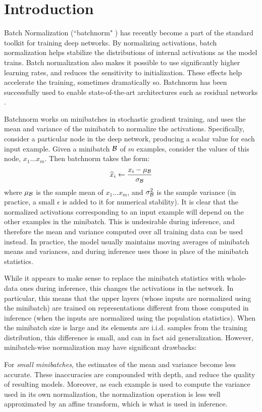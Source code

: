 \section{Introduction}

Batch Normalization (``batchnorm" \cite{batchnorm}) has recently become a part of the standard toolkit for training deep networks. By normalizing activations, batch normalization helps stabilize the distributions of internal activations as the model trains. Batch normalization also makes it possible to use significantly higher learning rates, and reduces the sensitivity to initialization. These effects help accelerate the training, sometimes dramatically so. Batchnorm has been successfully used to enable  state-of-the-art architectures such as residual networks \cite{resnet}.

Batchnorm works on minibatches in stochastic gradient training, and uses the mean and variance of the minibatch  to normalize the activations. Specifically, consider a particular node in the deep network, producing a scalar value for each input example. Given a minibatch $\mathcal{B}$ of $m$ examples, consider the values of this node, $x_1\ldots x_m$. Then batchnorm takes the form:
$$
\widehat{x}_i \leftarrow \frac{x_i-\mu_{\mathcal{B}}}{\sigma_{\mathcal{B}}}
$$
where $\mu_{\mathcal{B}}$ is the sample mean of $x_1\ldots x_m$, and $\sigma_{\mathcal{B}}^2$ is the sample variance (in practice, a small $\epsilon$ is added to it for numerical stability). It is clear that the normalized activations corresponding to an input example will depend on the other examples in the  minibatch. This is undesirable during inference, and therefore the mean and variance computed over all training data can be used instead. In practice, the model usually maintains moving averages of minibatch means and variances, and during inference uses those in place of the minibatch statistics. 

While it appears to make sense to replace the minibatch statistics with whole-data ones during inference, this changes the activations in the network. In particular, this means that the upper layers (whose inputs are normalized using the minibatch) are trained on representations different from those computed in inference (when the inputs are normalized using the population statistics). When the minibatch size is large and its elements are i.i.d. samples from the training distribution, this difference is small, and can in fact aid generalization. However,  minibatch-wise normalization may have significant drawbacks:

For {\em small minibatches}, the estimates of the mean and variance become less accurate. These inaccuracies are compounded with depth, and reduce the quality of resulting models. Moreover, as each example is used to compute the variance used in its own normalization, the normalization operation is less well approximated by an affine transform, which is what is used in inference.

